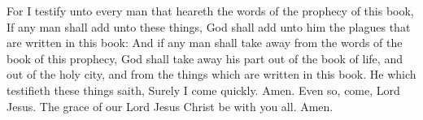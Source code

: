  For I testify unto every man that heareth the words of
the prophecy of this book, If any man shall add unto these things, God
shall add unto him the plagues that are written in this book:
 And if any man shall take away from the words of the
book of this prophecy, God shall take away his part out of the book of
life, and out of the holy city, and from the things which are written in
this book.  He which testifieth these things saith,
Surely I come quickly. Amen. Even so, come, Lord Jesus. 
The grace of our Lord Jesus Christ be with you all. Amen.
